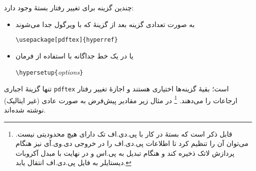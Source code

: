 چندین گزینه برای تغییر رفتار بستهٔ  وجود دارد:
\begin{itemize}
\item  به صورت تعدادی گزینه بعد از گزینهٔ  که با ویرگول جدا می‌شوند

\setLR
 \verb+\usepackage[pdftex]{hyperref}+
\setRL

\item یا در یک خط جداگانه با استفاده از فرمان
 
\setLR
 \verb+\hypersetup{+\emph{options}\verb+}+
\setRL

\end{itemize}

تنها گزینهٔ اجباری \texttt{pdftex} است؛ بقیهٔ گزینه‌ها اختیاری هستند و اجازهٔ تغییر رفتار ارجاعات را می‌دهند.%
\footnote{قابل ذکر است که بستهٔ  در کار با پی.دی.اف تک دارای هیچ محدودیتی نیست. می‌توان آن را تنظیم کرد تا 
اطلاعات پی.دی.اف را در خروجی دی.وی.آی نیز هنگام پردازش لاتک ذخیره کند و  هنگام تبدیل به پی.اس و در نهایت با مبدل‌ آکروبات دیستایلر به فایل پی.دی.اف انتقال یابد.}  در مثال زیر مقادیر پیش‌فرض به صورت عادی 
(غیر ایتالیک)
نوشته شده‌اند.


